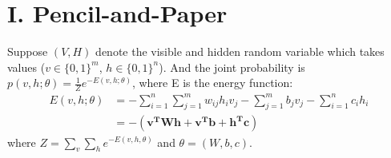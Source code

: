 

\usepackage{graphicx, amssymb, amsmath, listings, float, mathtools}
\usepackage{color, url}
\lstset{language = Python}
\lstset{breaklines}
\lstset{extendedchars=false}
\usepackage{xcolor}

\oddsidemargin 0in
\evensidemargin 0in
\textwidth 6.5in
\topmargin -0.6in
\textheight 9.0in

\newsavebox\MBox
\newcommand\Cline[2][red]{{\sbox\MBox{$#2$}%
  \rlap{\usebox\MBox}\color{#1}\rule[-2\dp\MBox]{\wd\MBox}{2pt}}}




\section*{\Large I. Pencil-and-Paper}
Suppose $(V, H)$ denote the visible and hidden random variable which takes values ($v \in \{0, 1\}^m$, $h \in \{0, 1\}^n$). And the joint probability is $p(v, h; \theta) = \frac{1}{Z}e^{-E(v, h; \theta)}$, where E is the energy function:
\begin{equation}
\begin{split}
E(v, h; \theta) & = -\sum_{i=1}^n \sum_{j=1}^m w_{ij} h_i v_j - \sum_{j=1}^m b_j v_j - \sum_{i=1}^n c_i h_i \\
				& = -(\mathbf{v^T W h + v^T b + h^T c})
\end{split}
\end{equation}
where $Z = \sum_v \sum_h e^{-E(v, h, \theta)}$ and $\theta = (W, b, c)$.


